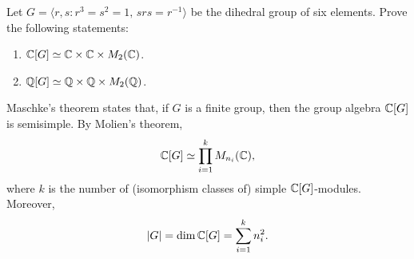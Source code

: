 \begin{exercise}
\label{xca:isos_dihedral}
	Let $G=\langle r,s:r^3=s^2=1,\,srs=r^{-1}\rangle$ be the dihedral group of six elements. 
	Prove the following statements:
	\begin{enumerate}
	    \item $\mathbb{C}[G]\simeq\mathbb{C}\times\mathbb{C}\times M_2(\mathbb{C})$.
	    \item $\mathbb{Q}[G]\simeq\mathbb{Q}\times\mathbb{Q}\times M_2(\mathbb{Q})$.
	\end{enumerate}  
\end{exercise}



Maschke's theorem states that, if $G$ is a finite group, 
then the group algebra $\mathbb{C}[G]$ is semisimple. By Molien's theorem, 
\[
\mathbb{C}[G]\simeq \prod_{i=1}^k M_{n_i}(\mathbb{C}),
\]
where $k$ is the number of (isomorphism classes of) 
simple $\mathbb{C}[G]$-modules. Moreover, 
\[
|G|=\dim\mathbb{C}[G]=\sum_{i=1}^k n_i^2.
\]

